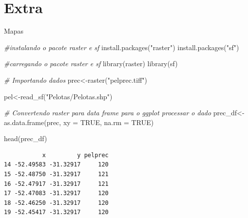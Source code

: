 \documentclass[
  ignorenonframetext,
]{beamer}
\newenvironment{Shaded}{}{}
\newcommand{\AttributeTok}[1]{\textcolor[rgb]{0.49,0.56,0.16}{#1}}
\newcommand{\CommentTok}[1]{\textcolor[rgb]{0.38,0.63,0.69}{\textit{#1}}}
\newcommand{\ConstantTok}[1]{\textcolor[rgb]{0.53,0.00,0.00}{#1}}
\newcommand{\FunctionTok}[1]{\textcolor[rgb]{0.02,0.16,0.49}{#1}}
\newcommand{\NormalTok}[1]{#1}
\newcommand{\OtherTok}[1]{\textcolor[rgb]{0.00,0.44,0.13}{#1}}
\newcommand{\StringTok}[1]{\textcolor[rgb]{0.25,0.44,0.63}{#1}}
\begin{document}
\section{Extra}\label{extra}

\begin{frame}[fragile]{Mapas}
\label{mapas}
\begin{Shaded}
\begin{Highlighting}[]
\CommentTok{\#instalando o pacote raster e sf}
\FunctionTok{install.packages}\NormalTok{(}\StringTok{"raster"}\NormalTok{)}
\FunctionTok{install.packages}\NormalTok{(}\StringTok{"sf"}\NormalTok{)}

\CommentTok{\#carregando o pacote raster e sf}
\FunctionTok{library}\NormalTok{(raster)}
\FunctionTok{library}\NormalTok{(sf)}
\end{Highlighting}
\end{Shaded}
\end{frame}

\begin{frame}[fragile]
\begin{Shaded}
\begin{Highlighting}[]
\CommentTok{\# Importando dados}
\NormalTok{prec}\OtherTok{\textless{}{-}}\FunctionTok{raster}\NormalTok{(}\StringTok{"pelprec.tiff"}\NormalTok{)}

\NormalTok{pel}\OtherTok{\textless{}{-}}\FunctionTok{read\_sf}\NormalTok{(}\StringTok{"Pelotas/Pelotas.shp"}\NormalTok{)}

\CommentTok{\# Convertendo raster para data frame para o ggplot processar o dado}
\NormalTok{prec\_df}\OtherTok{\textless{}{-}}\FunctionTok{as.data.frame}\NormalTok{(prec, }\AttributeTok{xy =} \ConstantTok{TRUE}\NormalTok{, }\AttributeTok{na.rm =} \ConstantTok{TRUE}\NormalTok{)}

\FunctionTok{head}\NormalTok{(prec\_df)}
\end{Highlighting}
\end{Shaded}

\begin{verbatim}
           x         y pelprec
14 -52.49583 -31.32917     120
15 -52.48750 -31.32917     121
16 -52.47917 -31.32917     121
17 -52.47083 -31.32917     120
18 -52.46250 -31.32917     120
19 -52.45417 -31.32917     120
\end{verbatim}
\end{frame}
\end{document}
